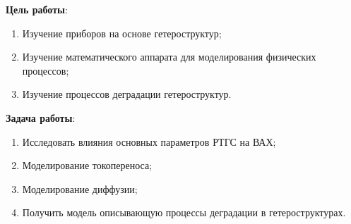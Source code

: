\Introduction

\textbf{Цель работы}:
\begin{enumerate}
	\item Изучение приборов на основе гетероструктур;
	\item Изучение математического аппарата для моделирования физических процессов;
	\item Изучение процессов деградации гетероструктур.
\end{enumerate}

\textbf{Задача работы}:
\begin{enumerate}
	\item Исследовать влияния основных параметров РТГС на ВАХ;
	\item Моделирование токопереноса;
	\item Моделирование диффузии;
	\item Получить модель описывающую процессы деградации в гетероструктурах.
\end{enumerate}